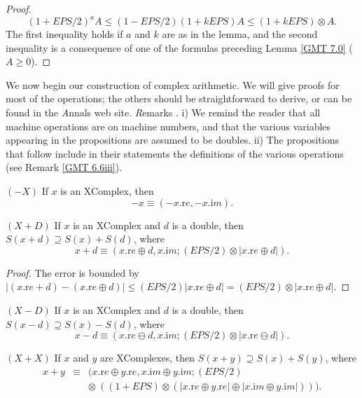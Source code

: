 \begin{proof}{} 
$$(1 + EPS/2)^a A\le (1 - EPS/2)(1 + k EPS) A \le (1 + k EPS) \otimes A.$$ 
The first inequality holds if $a$ and $k$ are as in the lemma, and the second inequality is a consequence of one of the
formulas preceding Lemma \ref{GMT 7.0} ($A \ge 0$). \end{proof}
 
We now begin our construction of complex arithmetic. We will give proofs for most of the operations; the others should be straightforward to derive,
or can be found in the {\textit Annals} web site.
{\textit Remarks} \label{GMT 7.5}.
i) We remind the reader that all machine operations are on machine numbers, and that the various variables appearing in the propositions are assumed to be doubles.
ii) The propositions that follow include in their statements the definitions of the various operations (see Remark \ref{GMT 6.6iii}).

\begin{proposition}\label{GMT 7.1}{$(-X)$}
If $x$ is an {\textrm XComplex,} then 
$$-x \equiv (-x.{\mathrm re},-x.{\mathrm im}).$$ 
\end{proposition}

\begin{proposition}\label{GMT 7.2}{$(X + D)$} 
If $x$ is an {\textrm XComplex} and $d$ is a double{\textrm ,} then 
$S(x + d) \supseteq S(x) + S(d)${\textrm ,} where 
 $$x + d \equiv (x.{\mathrm re} \oplus d, x.{\mathrm im};
(EPS/2)\otimes |x.{\mathrm re} \oplus d|).$$
\end{proposition}

\begin{proof}{}
The  error is bounded by  
\hfill ${\displaystyle |(x.{\mathrm re} + d) - (x.{\mathrm re} \oplus d)|
\le (EPS/2) | x.{\mathrm re} \oplus d|
  =  (EPS/2) \otimes | x.{\mathrm re} \oplus d|.}$ \end{proof}

\begin{proposition}\label{GMT 7.3}{$(X - D)$}
If $x$ is an {\textrm XComplex} and $d$ is a double{\textrm ,} then 
$S(x - d) \supseteq S(x) - S(d)${\textrm ,} where 
 $$x - d \equiv (x.{\mathrm re} \ominus d, x.{\mathrm im};
(EPS/2)\otimes |x.{\mathrm re} \ominus d|).$$ \end{proposition}

\begin{proposition}\label{GMT 7.4}{$(X + X)$}
If $x$ and $y$ are {\textrm XComplexes,} then 
$S(x + y) \supseteq S(x) + S(y)${\textrm ,} where
 \begin{eqnarray*}
x + y &\equiv& (x.{\mathrm re} \oplus y.{\mathrm re}, x.{\mathrm im} \oplus y.{\mathrm im};
(EPS/2)\\
&&  \otimes\ ((1 + EPS)  \otimes (|x.{\mathrm re} \oplus y.{\mathrm re}| \oplus |x.{\mathrm im} \oplus y.{\mathrm im}|))).
\end{eqnarray*}
\end{proposition}
  

